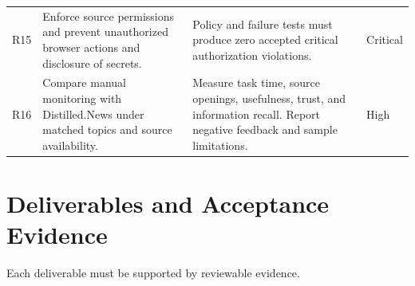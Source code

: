 \begin{longtable}{
    p{}
    p{}
    p{}
    p{}
}
R15
& Enforce source permissions and prevent unauthorized browser actions and disclosure of secrets.
& Policy and failure tests must produce zero accepted critical authorization violations.
& Critical \\

R16
& Compare manual monitoring with Distilled.News under matched topics and source availability.
& Measure task time, source openings, usefulness, trust, and information recall. Report negative feedback and sample limitations.
& High \\

\end{longtable}
\endgroup

\section{Deliverables and Acceptance Evidence}

Each deliverable must be supported by reviewable evidence.

